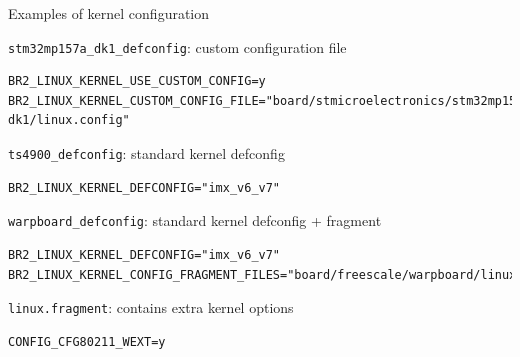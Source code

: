 \begin{frame}[fragile]{Examples of kernel configuration}

  \scriptsize

  \begin{block}{{\tt stm32mp157a\_dk1\_defconfig}: custom configuration file}
\begin{verbatim}
BR2_LINUX_KERNEL_USE_CUSTOM_CONFIG=y
BR2_LINUX_KERNEL_CUSTOM_CONFIG_FILE="board/stmicroelectronics/stm32mp157a-dk1/linux.config"
\end{verbatim}
  \end{block}

  \begin{block}{{\tt ts4900\_defconfig}: standard kernel defconfig}
\begin{verbatim}
BR2_LINUX_KERNEL_DEFCONFIG="imx_v6_v7"
\end{verbatim}
  \end{block}

  \begin{block}{{\tt warpboard\_defconfig}: standard kernel defconfig + fragment}
\begin{verbatim}
BR2_LINUX_KERNEL_DEFCONFIG="imx_v6_v7"
BR2_LINUX_KERNEL_CONFIG_FRAGMENT_FILES="board/freescale/warpboard/linux.fragment"
\end{verbatim}
  \end{block}

  \begin{block}{{\tt linux.fragment}: contains extra kernel options}
\begin{verbatim}
CONFIG_CFG80211_WEXT=y
\end{verbatim}
  \end{block}

\end{frame}

